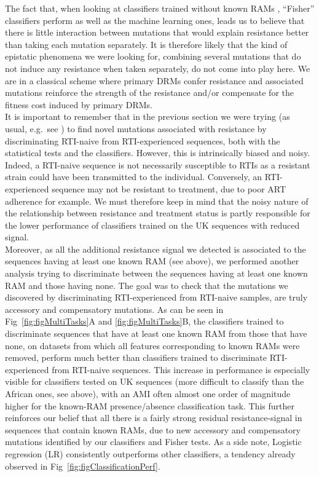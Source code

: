 \documentclass[
  11,
]{scrbook}
\begin{document}
The fact that, when looking at classifiers trained without known RAMs ,
``Fisher'' classifiers perform as well as the machine learning ones, leads
us to believe that there is little interaction between mutations that
would explain resistance better than taking each mutation separately. It
is therefore likely that the kind of epistatic phenomena we were looking
for, combining several mutations that do not induce any resistance when
taken separately, do not come into play here. We are in a classical
scheme where primary DRMs confer resistance and associated mutations
reinforce the strength of the resistance and/or compensate for the
fitness cost induced by primary DRMs.\\
It is important to remember that in the previous section we were trying
(as usual, e.g.~see \autocite{villabona-arenasIndepthAnalysisHIV12016}) to find
novel mutations associated with resistance by discriminating RTI-naive
from RTI-experienced sequences, both with the statistical tests and the
classifiers. However, this is intrinsically biased and noisy. Indeed, a
RTI-naive sequence is not necessarily susceptible to RTIs as a resistant
strain could have been transmitted to the individual. Conversely, an
RTI-experienced sequence may not be resistant to treatment, due to poor
ART adherence for example. We must therefore keep in mind that the noisy
nature of the relationship between resistance and treatment status is
partly responsible for the lower performance of classifiers trained on
the UK sequences with reduced signal.\\
Moreover, as all the additional resistance signal we detected is
associated to the sequences having at least one known RAM (see above),
we performed another analysis trying to discriminate between the
sequences having at least one known RAM and those having none. The goal
was to check that the mutations we discovered by discriminating
RTI-experienced from RTI-naive samples, are truly accessory and
compensatory mutations. As can be seen in
Fig~\ref{fig:figMultiTasks}A
and \ref{fig:figMultiTasks}B,
the classifiers trained to discriminate sequences that have at least one
known RAM from those that have none, on datasets from which all features
corresponding to known RAMs were removed, perform much better than
classifiers trained to discriminate RTI-experienced from RTI-naive
sequences. This increase in performance is especially visible for
classifiers tested on UK sequences (more difficult to classify than the
African ones, see above), with an AMI often almost one order of
magnitude higher for the known-RAM presence/absence classification task.
This further reinforces our belief that all there is a fairly strong
residual resistance-signal in sequences that contain known RAMs, due to
new accessory and compensatory mutations identified by our classifiers
and Fisher tests. As a side note, Logistic regression (LR) consistently
outperforms other classifiers, a tendency already observed in
Fig~\ref{fig:figClassificationPerf}.
\end{document}
